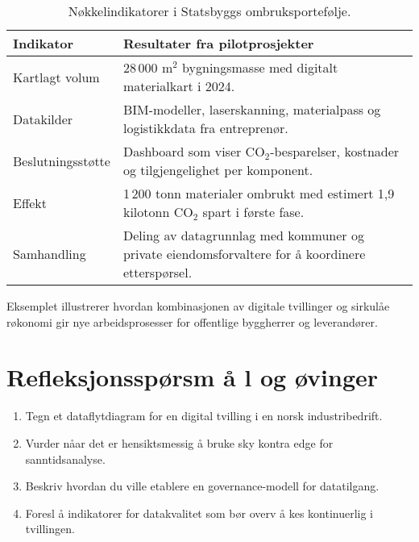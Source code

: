 \begin{table}[ht]
    \centering
    \caption{Nøkkelindikatorer i Statsbyggs ombruksportefølje.}
    \label{tab:kap03-loopfront}
    \begin{tabular}{p{}p{}}
        \toprule
        \textbf{Indikator} & \textbf{Resultater fra pilotprosjekter} \\
        \midrule
        Kartlagt volum & 28\,000 m$^2$ bygningsmasse med digitalt materialkart i 2024. \\
        Datakilder & BIM-modeller, laserskanning, materialpass og logistikkdata fra entreprenør. \\
        Beslutningsstøtte & Dashboard som viser CO$_2$-besparelser, kostnader og tilgjengelighet per komponent. \\
        Effekt & 1\,200 tonn materialer ombrukt med estimert 1,9 kilotonn CO$_2$ spart i første fase. \\
        Samhandling & Deling av datagrunnlag med kommuner og private eiendomsforvaltere for  å koordinere etterspørsel. \\
        \bottomrule
    \end{tabular}
\end{table}

Eksemplet illustrerer hvordan kombinasjonen av digitale tvillinger og sirkulåe røkonomi gir nye arbeidsprosesser for offentlige byggherrer og leverandører.

\section{Refleksjonsspørsm å l og øvinger}
\begin{enumerate}
    \item Tegn et dataflytdiagram for en digital tvilling i en norsk industribedrift.
    \item Vurder nåar det er hensiktsmessig  å bruke sky kontra edge for sanntidsanalyse.
    \item Beskriv hvordan du ville etablere en governance-modell for datatilgang.
    \item Foresl å indikatorer for datakvalitet som bør overv å kes kontinuerlig i tvillingen.
\end{enumerate}
